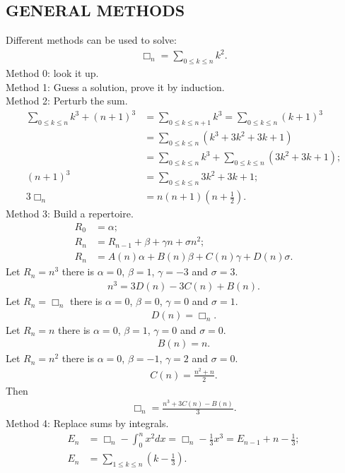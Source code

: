 \documentclass{article}
\begin{document}
\subsection{GENERAL METHODS}
Different methods can be used to solve:
\begin{align}
\Box_n = \sum_{0 \le k \le n} {k^2}.
\end{align}
Method 0: look it up.\\
Method 1: Guess a solution, prove it by induction.\\
Method 2: Perturb the sum.
\begin{align}
\sum_{0 \le k \le n} {k^3} + (n+1)^3 &= \sum_{0 \le k \le n+1} {k^3} = \sum_{0 \le k \le n} {(k+1)^3} \\
                                     &= \sum_{0 \le k \le n} (k^3 + 3k^2 + 3k + 1) \\
				     &= \sum_{0 \le k \le n} {k^3} + \sum_{0 \le k \le n} {(3k^2 + 3k + 1)};\\
(n+1)^3 &= \sum_{0 \le k \le n} {3k^2 + 3k + 1};\\
3\Box_n &= n (n+1) (n + \frac{1}{2}).
\end{align}
Method 3: Build a repertoire.
\begin{align}
R_0 &= \alpha; \\
R_n &= R_{n-1} + \beta + \gamma n + \sigma n^2;\\
R_n &= A(n)\alpha + B(n) \beta + C(n) \gamma + D(n) \sigma.
\end{align}
Let $R_n = n^3$ there is $\alpha = 0$, $\beta = 1$, $\gamma = -3$ and $\sigma = 3$.
\begin{align}
n^3 = 3D(n) - 3C(n) + B(n).
\end{align}
Let $R_n = \Box_n$ there is $\alpha = 0$, $\beta = 0$, $\gamma = 0$ and $\sigma = 1$.
\begin{align}
D(n) = \Box_n.
\end{align}
Let $R_n = n$ there is $\alpha = 0$, $\beta = 1$, $\gamma = 0$ and $\sigma = 0$.
\begin{align}
B(n) = n.
\end{align}
Let $R_n = n^2$ there is $\alpha = 0$, $\beta = -1$, $\gamma = 2$ and $\sigma = 0$.
\begin{align}
C(n) = \frac{n^2 + n}{2}.
\end{align}
Then 
\begin{align}
\Box_n = \frac {n^3 + 3C(n) - B(n)}{3}.
\end{align}
Method 4: Replace sums by integrals.
\begin{align}
E_n &= \Box_n - \int_{0}^{n}x^2dx = \Box_n - \frac{1}{3}x^3 = E_{n-1} + n - \frac{1}{3};\\
E_n &= \sum_{1 \le k \le n} (k - \frac{1}{3}).
\end{align}
\end{document}
